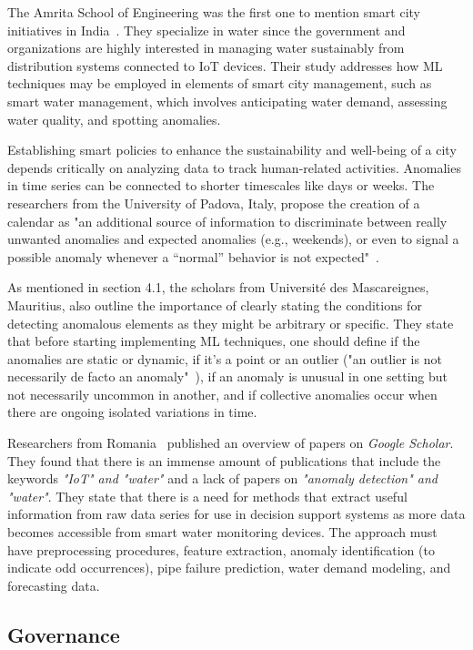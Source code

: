 \documentclass[a4paper,12pt,twoside]{ThesisStyle}
\begin{document}
The Amrita School of Engineering was the first one to mention smart city initiatives in India~\cite{vijai2016design}. They specialize in water since the government and organizations are highly interested in managing water sustainably from distribution systems connected to IoT devices. Their study addresses how ML techniques may be employed in elements of smart city management, such as smart water management, which involves anticipating water demand, assessing water quality, and spotting anomalies. 

Establishing smart policies to enhance the sustainability and well-being of a city depends critically on analyzing data to track human-related activities. Anomalies in time series can be connected to shorter timescales like days or weeks. The researchers from the University of Padova, Italy, propose the creation of a calendar as "an additional source of information to discriminate between really unwanted anomalies and expected anomalies (e.g., weekends), or even to signal a possible anomaly whenever a “normal” behavior is not expected"~\cite{Carbone2017heating}. 

As mentioned in section 4.1, the scholars from Université des Mascareignes, Mauritius, also outline the importance of clearly stating the conditions for detecting anomalous elements as they might be arbitrary or specific. They state that before starting implementing ML techniques, one should define if the anomalies are static or dynamic, if it's a point or an outlier ("an outlier is not necessarily de facto an anomaly"~\cite{mohamudally2018building}), if an anomaly is unusual in one setting but not necessarily uncommon in another, and if collective anomalies occur when there are ongoing isolated variations in time.

Researchers from Romania~\cite{hangan2022advanced} published an overview of papers on \textit{Google Scholar}. They found that there is an immense amount of publications that include the keywords \textit{"IoT" and "water"} and a lack of papers on \textit{"anomaly detection" and "water"}. They state that there is a need for methods that extract useful information from raw data series for use in decision support systems as more data becomes accessible from smart water monitoring devices. The approach must have preprocessing procedures, feature extraction, anomaly identification (to indicate odd occurrences), pipe failure prediction, water demand modeling, and forecasting data. 

\subsection{Governance}
\end{document}
